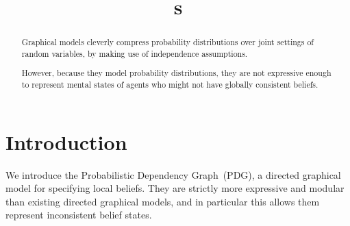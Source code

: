 \documentclass{article}
\title{\ModelName s}
\author{} %
\newcommand{\ModelName}{Probabilistic Dependency Graph}
\newcommand{\modelname}{probabilistic dependency graph}
\newcommand{\modelnames}{\modelname s}
\newcommand{\MN}{PDG}
\newcommand{\MNs}{\MN s}
\begin{document}
	\maketitle

	\begin{abstract}
		Graphical models cleverly compress probability distributions over joint settings of random variables, by making use of independence assumptions.
		
		However, because they model probability distributions, they are not expressive enough to represent mental states of agents who might not have globally consistent beliefs. 
			
		
	\end{abstract}


	\section{Introduction}
	
	We introduce the \ModelName\ (\MN), a directed graphical model for specifying local beliefs. They are strictly more expressive and modular than existing directed graphical models, and in particular this allows them represent inconsistent belief states.
	
	
\end{document}
